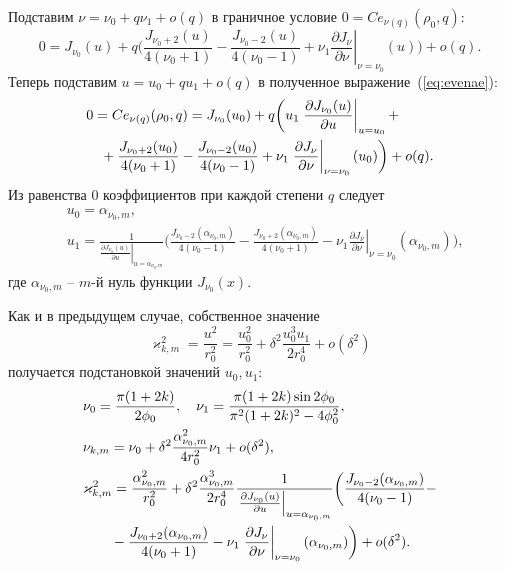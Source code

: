 Подставим  $\nu = \nu_0 + q \nu_1 + o(q)$  в граничное условие $0 = Ce_{\nu(q)}(\rho_0, q)$:
\begin{equation}
    0 = 
    J_{\nu_0}(u) + q \biggl( 
    \frac{J_{\nu_0+2}(u)}{4(\nu_0+1)}  - \frac{J_{\nu_0-2}(u)}{4(\nu_0-1)}
    + \nu_1 \left.\frac{\partial J_\nu}{\partial \nu}\right|_{\nu=\nu_0}(u)
    \biggr) + o(q).\label{eq:evenae}
\end{equation}
Теперь подставим $u = u_0 + q u_1 + o(q)$  в полученное выражение~(\ref{eq:evenae}):
\begin{align*}
    &0 =  Ce_{\nu(q)}(\rho_0, q) = 
    J_{\nu_0}(u_0) + q \biggl( 
    u_1 \left.\frac{\partial J_{\nu_0} (u)}{\partial u}\right|_{u=u_0} +  \notag \\
  &\quad{}  + \frac{J_{\nu_0+2}(u_0)}{4(\nu_0+1)} - \frac{J_{\nu_0-2}(u_0)}{4(\nu_0-1)}    + \nu_1 \left.\frac{\partial J_\nu}{\partial \nu}\right|_{\nu=\nu_0}(u_0)
    \biggr) + o(q).
\end{align*}
Из равенства $0$ коэффициентов при каждой степени $q$ следует
\begin{align*}
&u_0 = \alpha_{\nu_0, m}, \\
&u_1 = \frac{1}{\left.\frac{\partial J_{\nu_0} (u)}{\partial u}\right|_{u=\alpha_{\nu_0, m}}} 
\biggl(
\frac{J_{\nu_0-2}(\alpha_{\nu_0, m})}{4(\nu_0-1)} - \frac{J_{\nu_0+2}(\alpha_{\nu_0, m})}{4(\nu_0+1)}
 - \nu_1 \left.\frac{\partial J_\nu}{\partial \nu}\right|_{\nu=\nu_0}(\alpha_{\nu_0, m})
\biggr),
\end{align*}
где $\alpha_{\nu_0, m}$ -- $m$-й нуль функции $J_{\nu_0}(x)$.  

Как и в предыдущем случае, собственное значение
$$\varkappa_{k, m}^2 = \frac{u^2}{r_0^2} = \frac{u_0^2}{r_0^2} + \delta^2 \frac{u_0^3 u_1}{2r_0^4} + o(\delta^2)$$ получается подстановкой значений $u_0, u_1$:
\begin{align*}
&\nu_0 = \frac{\pi (1 + 2 k)}{2 \phi_0}, \quad \nu_1 = \frac{\pi (1+2k) \sin 2\phi_0}{\pi^2(1+2k)^2 - 4\phi_0^2},\\
& \nu_{k, m} = \nu_0 + \delta^2 \frac{\alpha_{\nu_0, m}^2}{4 r_0^2} \nu_1 + o(\delta^2), \\
&\varkappa_{k, m}^2 = \frac{\alpha_{\nu_0, m}^2}{r_0^2} + \delta^2 \frac{\alpha_{\nu_0, m}^3}{2r_0^4} \frac{1}{\left.\frac{\partial J_{\nu_0} (u)}{\partial u}\right|_{u=\alpha_{\nu_0, m}}}\biggl(
\frac{J_{\nu_0-2}(\alpha_{\nu_0, m})}{4(\nu_0-1)} - \notag\\
&\qquad{} - \frac{J_{\nu_0+2}(\alpha_{\nu_0, m})}{4(\nu_0+1)}    - \nu_1 \left.\frac{\partial J_\nu}{\partial \nu}\right|_{\nu=\nu_0}(\alpha_{\nu_0, m})
\biggr) + o(\delta^2).
\end{align*}

